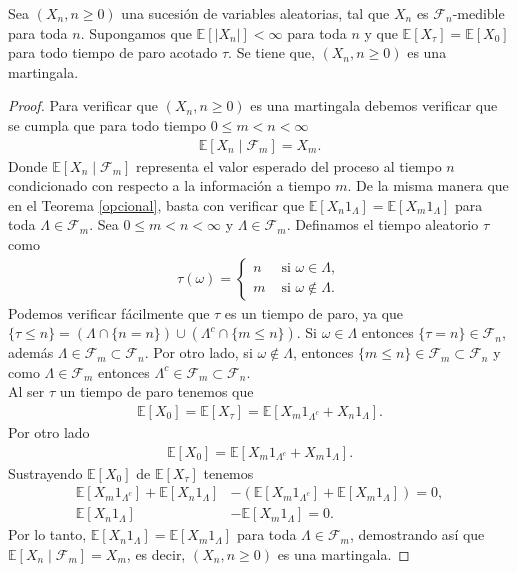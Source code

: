 \begin{theorem}
\label{condmartin}
	Sea $(X_n, n \geq 0)$ una sucesión de variables aleatorias, tal que $X_n$ es $\mathcal{F}_n$-medible para toda $n$. Supongamos que $\mathbb{E}[|X_n|] < \infty$ para toda $n$ y que $\mathbb{E}[X_{\tau}] = \mathbb{E}[X_0]$ para todo tiempo de paro acotado $\tau$. Se tiene que, $(X_n, n \geq 0)$ es una martingala.
\end{theorem}
\begin{proof}
	Para verificar que $(X_n, n \geq 0)$ es una martingala debemos verificar que se cumpla que para todo tiempo $0 \leq m < n < \infty$
	\begin{align*}
		\mathbb{E}[X_n \mid \mathcal{F}_m] = X_m.
	\end{align*}
	Donde $\mathbb{E}[X_n \mid \mathcal{F}_m]$ representa el valor esperado del proceso al tiempo $n$ condicionado con respecto a la información a tiempo $m$. De la misma manera que en el Teorema \ref{opcional}, basta con verificar que $\mathbb{E}[X_n 1_{\Lambda}] = \mathbb{E}[X_m 1_{\Lambda}]$ para toda $\Lambda \in \mathcal{F}_m$.
	Sea $0 \leq m < n < \infty$ y $\Lambda \in \mathcal{F}_m$. Definamos el tiempo aleatorio $\tau$ como
	\begin{align*}
		\tau (\omega) =
		\begin{cases}
			n & \text{ si } \omega \in \Lambda, \\
			m & \text{ si } \omega \notin \Lambda.
		\end{cases}
	\end{align*}
	Podemos verificar fácilmente que $\tau$ es un tiempo de paro, ya que $\{\tau \leq n\} = (\Lambda \cap \{n = n\}) \cup (\Lambda^c \cap \{m \leq n\})$. Si $\omega \in \Lambda$ entonces $\{\tau = n\} \in \mathcal{F}_n$, además $\Lambda \in \mathcal{F}_m \subset \mathcal{F}_n$. Por otro lado, si $\omega \notin\Lambda$, entonces $\{m \leq n\} \in \mathcal{F}_m \subset \mathcal{F}_n$ y como $\Lambda \in \mathcal{F}_m$ entonces $\Lambda^c \in \mathcal{F}_m \subset \mathcal{F}_n$. \\
	
\noindent Al ser $\tau$ un tiempo de paro tenemos que
	\begin{align*}
		\mathbb{E}[X_0] = \mathbb{E}[X_{\tau}] = \mathbb{E}[X_m1_{\Lambda^c} + X_n1_{\Lambda}].
	\end{align*}
	Por otro lado
	\begin{align*}
		\mathbb{E}[X_0] = \mathbb{E}[X_m1_{\Lambda^c} + X_m1_{\Lambda}].
	\end{align*}
	Sustrayendo $\mathbb{E}[X_0]$ de $\mathbb{E}[X_{\tau}]$ tenemos
	\begin{align*}
		\mathbb{E}[X_m1_{\Lambda^c}] + \mathbb{E}[X_n1_{\Lambda}] & - (\mathbb{E}[X_m1_{\Lambda^c}] + \mathbb{E}[X_m1_{\Lambda}]) = 0, \\
		\mathbb{E}[X_n1_{\Lambda}] & -  \mathbb{E}[X_m1_{\Lambda}] = 0.
	\end{align*}
	Por lo tanto, $\mathbb{E}[X_n1_{\Lambda}] = \mathbb{E}[X_m1_{\Lambda}]$ para toda $\Lambda \in \mathcal{F}_m$, demostrando así que $\mathbb{E}[X_n \mid \mathcal{F}_m] = X_m$, es decir, $(X_n, n \geq 0)$ es una martingala. 
\end{proof}

